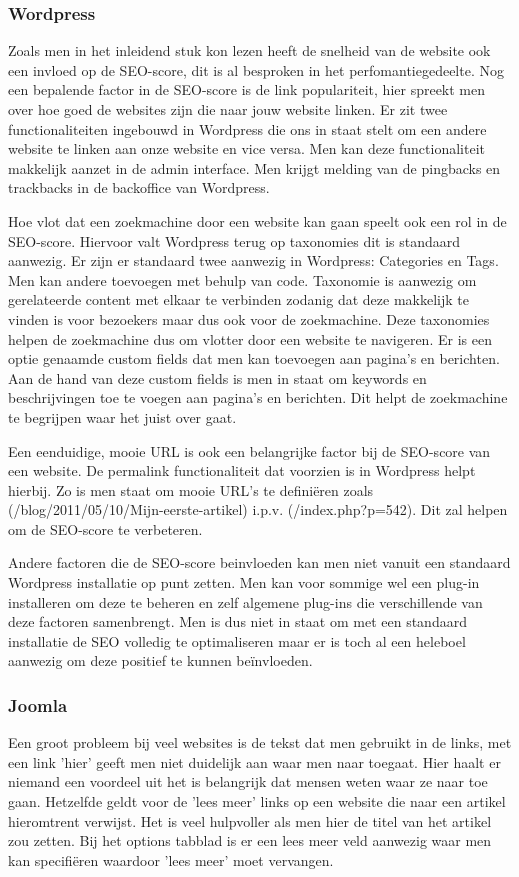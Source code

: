 \subsubsection{Wordpress}
Zoals men in het inleidend stuk kon lezen heeft de snelheid van de website ook een invloed op de SEO-score, dit is al besproken in het perfomantiegedeelte. Nog een bepalende factor in de SEO-score is de link populariteit, hier spreekt men over hoe goed de websites zijn die naar jouw website linken. Er zit twee functionaliteiten ingebouwd in Wordpress die ons in staat stelt om een andere website te linken aan onze website en vice versa. Men kan deze functionaliteit makkelijk aanzet in de admin interface. Men krijgt melding van de pingbacks en trackbacks in de backoffice van Wordpress.

Hoe vlot dat een zoekmachine door een website kan gaan speelt ook een rol in de SEO-score. Hiervoor valt Wordpress terug op taxonomies dit is standaard aanwezig. Er zijn er standaard twee aanwezig in Wordpress: Categories en Tags. Men kan andere toevoegen met behulp van code. Taxonomie is aanwezig om gerelateerde content met elkaar te verbinden zodanig dat deze makkelijk te vinden is voor bezoekers maar dus ook voor de zoekmachine. Deze taxonomies helpen de zoekmachine dus om vlotter door een website te navigeren. Er is een optie genaamde custom fields dat men kan toevoegen aan pagina's en berichten. Aan de hand van deze custom fields is men in staat om keywords en beschrijvingen toe te voegen aan pagina's en berichten. Dit helpt de zoekmachine te begrijpen waar het juist over gaat.

Een eenduidige, mooie URL is ook een belangrijke factor bij de SEO-score van een website. De permalink functionaliteit dat voorzien is in Wordpress helpt hierbij. Zo is men staat om mooie URL's te definiëren zoals (/blog/2011/05/10/Mijn-eerste-artikel) i.p.v. (/index.php?p=542). Dit zal helpen om de SEO-score te verbeteren.

Andere factoren die de SEO-score beinvloeden kan men niet vanuit een standaard Wordpress installatie op punt zetten. Men kan voor sommige wel een plug-in installeren om deze te beheren en zelf algemene plug-ins die verschillende van deze factoren samenbrengt. Men is dus niet in staat om met een standaard installatie de SEO volledig te optimaliseren maar er is toch al een heleboel aanwezig om deze positief te kunnen beïnvloeden.
\subsubsection{Joomla}
Een groot probleem bij veel websites is de tekst dat men gebruikt in de links, met een link 'hier' geeft men niet duidelijk aan waar men naar toegaat. Hier haalt er niemand een voordeel uit het is belangrijk dat mensen weten waar ze naar toe gaan. Hetzelfde geldt voor de 'lees meer' links op een website die naar een artikel hieromtrent verwijst. Het is veel hulpvoller als men hier de titel van het artikel zou zetten. Bij het options tabblad is er een lees meer veld aanwezig waar men kan specifiëren waardoor 'lees meer' moet vervangen.

